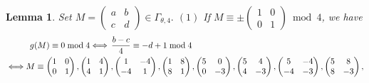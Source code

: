 \documentclass[12pt]{article}
\theoremstyle{definition}
\newtheorem{lemma}[theorem]{Lemma}
\numberwithin{equation}{section}
\numberwithin{theorem}{section}
\begin{document}
\begin{lemma}
\label{lem:level4-mod4}
{\it
Set 
$
M=
\begin{pmatrix}
a & b \\
c & d
\end{pmatrix}
\in\Gamma_{\theta,4}.
$
\newline
$\mathrm{(1)}$ If 
$
M
\equiv
\pm
\begin{pmatrix}
1 & 0 \\
0 & 1
\end{pmatrix}
\bmod{4}
$, 
we have 
\begin{align}
&\hspace{10mm} g(M)\equiv 0 \bmod{4}  
\Longleftrightarrow
\, \frac{b-c}{4}\equiv -d+1 \bmod{4} \notag  \\
&\Longleftrightarrow
M
\equiv
\begin{pmatrix}
1 & 0 \\
0 & 1
\end{pmatrix}, 
\begin{pmatrix}
1 & 4 \\
4 & 1
\end{pmatrix}, 
\begin{pmatrix}
1 & -4 \\
-4 & 1
\end{pmatrix}, 
\begin{pmatrix}
1 & 8 \\
8 & 1
\end{pmatrix},  
\begin{pmatrix}
5 & 0 \\
0 & -3
\end{pmatrix}, 
\begin{pmatrix}
5 & 4 \\
4 & -3
\end{pmatrix}, 
\begin{pmatrix}
5 & -4 \\
-4 & -3
\end{pmatrix}, 
\begin{pmatrix}
5 & 8 \\
8 & -3
\end{pmatrix}, \notag  \\
&\hspace{10mm}

\end{align}}
\end{lemma}
\end{document}
